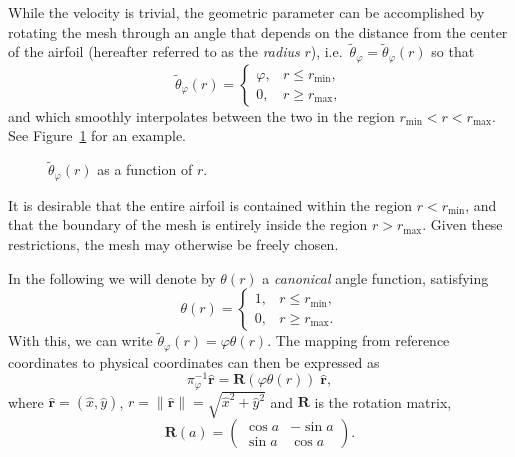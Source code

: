 \documentclass[onecolumn, twoside, a4paper, 11pt]{article}
\begin{document}
While the velocity is trivial, the geometric
parameter can be accomplished by rotating the mesh through an angle that depends
on the distance from the center of the airfoil (hereafter referred to as the
\emph{radius} $r$), i.e.~$\tilde{\theta}_\varphi = \tilde{\theta}_\varphi(r)$
so that
\[
  \tilde{\theta}_\varphi(r) = \begin{cases}
    \varphi, & r \le r_\text{min}, \\
    0, & r \ge r_\text{max},
  \end{cases}
\]
and which smoothly interpolates between the two in the region
$r_\text{min} < r < r_\text{max}$. See Figure~\ref{fig:thetatilde} for an
example.

\begin{figure}
  \begin{center}
  \end{center}
  \caption{$\tilde{\theta}_\varphi(r)$ as a function of $r$.}
  \label{fig:thetatilde}
\end{figure}

It is desirable that the entire airfoil is contained within the region $r <
r_\text{min}$, and that the boundary of the mesh is entirely inside the region
$r > r_\text{max}$. Given these restrictions, the mesh may otherwise be freely
chosen.

In the following we will denote by $\theta(r)$ a \emph{canonical} angle
function, satisfying
\[
  \theta(r) = \begin{cases}
    1, & r \le r_\text{min}, \\
    0, & r \ge r_\text{max}.
  \end{cases}
\]
With this, we can write $\tilde{\theta}_\varphi(r) = \varphi \theta(r)$.
The mapping from reference coordinates to physical coordinates can then be
expressed as
\[
  \pi_{\varphi}^{-1} \hat{\bm r}
  = \bm R(\varphi \theta(r)) \; \hat{\bm r},
\]
where $\hat{\bm r} = \left( \hat{x}, \hat{y} \right)$,
$r = \| \hat{\bm r} \| = \sqrt{\hat{x}^2 + \hat{y}^2}$
and $\bm R$ is the rotation matrix,
\[
  \bm R(a) = \begin{pmatrix} \cos a & - \sin a \\ \sin a & \cos a \end{pmatrix}.
\]
\end{document}
